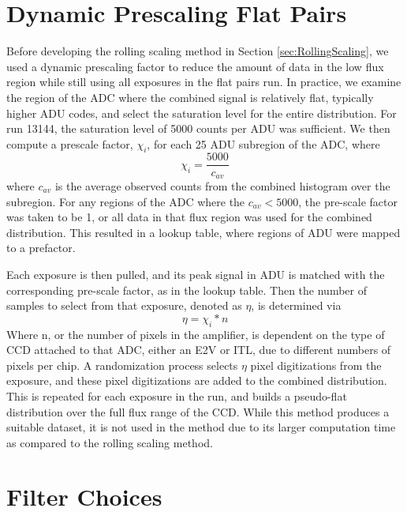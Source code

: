 \documentclass[linenumbers]{aastex7}
\begin{document}
\section{Dynamic Prescaling Flat Pairs}
\label{sec:Dynamic Prescaling}


Before developing the rolling scaling method in Section \ref{sec:RollingScaling}, we used a dynamic prescaling factor to reduce the amount of data in the low flux region while still using all exposures in the flat pairs run.
In practice, we examine the region of the ADC where the combined signal is relatively flat, typically higher ADU codes, and select the saturation level for the entire distribution. 
For run 13144, the saturation level of 5000 counts per ADU was sufficient. 
We then compute a prescale factor, $\chi _i$, for each 25 ADU subregion of the ADC, where
\begin{equation}
\chi_i = \frac{5000}{c_{av}}
\label{eq: prescale}
\end{equation}
where $c_{av}$ is the average observed counts from the combined histogram over the subregion. 
For any regions of the ADC where the $c_{av} < 5000$, the pre-scale factor was taken to be 1, or all data in that flux region was used for the combined distribution. 
This resulted in a lookup table, where regions of ADU were mapped to a prefactor. 

Each exposure is then pulled, and its peak signal in ADU is matched with the corresponding pre-scale factor, as in the lookup table. 
Then the number of samples to select from that exposure, denoted as $\eta $, is determined via
 \begin{equation}
 \eta = \chi_i *n 
 \label{eq:selectedsamples}
\end{equation}
Where n, or the number of pixels in the amplifier, is dependent on the type of CCD attached to that ADC, either an E2V or ITL, due to different numbers of pixels per chip.  
A randomization process selects $\eta$ pixel digitizations from the exposure, and these pixel digitizations are added to the combined distribution. 
This is repeated for each exposure in the run, and builds a pseudo-flat distribution over the full flux range of the CCD. 
While this method produces a suitable dataset, it is not used in the method due to its larger computation time as compared to the rolling scaling method. 

\section{Filter Choices}
\label{sec:OtherFilters} 
\end{document}
